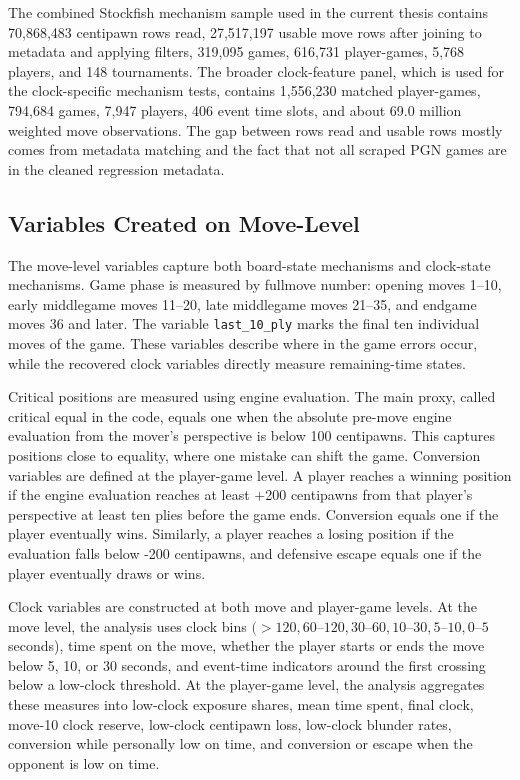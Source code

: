 The combined Stockfish mechanism sample used in the current thesis contains 70,868,483 centipawn rows read, 27,517,197 usable move rows after joining to metadata and applying filters, 319,095 games, 616,731 player-games, 5,768 players, and 148 tournaments. The broader clock-feature panel, which is used for the clock-specific mechanism tests, contains 1,556,230 matched player-games, 794,684 games, 7,947 players, 406 event time slots, and about 69.0 million weighted move observations. The gap between rows read and usable rows mostly comes from metadata matching and the fact that not all scraped PGN games are in the cleaned regression metadata.

\subsection{Variables Created on Move-Level}

The move-level variables capture both board-state mechanisms and clock-state mechanisms. Game phase is measured by fullmove number: opening moves 1--10, early middlegame moves 11--20, late middlegame moves 21--35, and endgame moves 36 and later. The variable \texttt{last\_10\_ply} marks the final ten individual moves of the game. These variables describe where in the game errors occur, while the recovered clock variables directly measure remaining-time states.

Critical positions are measured using engine evaluation. The main proxy, called critical equal in the code, equals one when the absolute pre-move engine evaluation from the mover's perspective is below 100 centipawns. This captures positions close to equality, where one mistake can shift the game. Conversion variables are defined at the player-game level. A player reaches a winning position if the engine evaluation reaches at least +200 centipawns from that player's perspective at least ten plies before the game ends. Conversion equals one if the player eventually wins. Similarly, a player reaches a losing position if the evaluation falls below -200 centipawns, and defensive escape equals one if the player eventually draws or wins.

Clock variables are constructed at both move and player-game levels. At the move level, the analysis uses clock bins \((>120, 60\text{--}120, 30\text{--}60, 10\text{--}30, 5\text{--}10, 0\text{--}5\) seconds), time spent on the move, whether the player starts or ends the move below 5, 10, or 30 seconds, and event-time indicators around the first crossing below a low-clock threshold. At the player-game level, the analysis aggregates these measures into low-clock exposure shares, mean time spent, final clock, move-10 clock reserve, low-clock centipawn loss, low-clock blunder rates, conversion while personally low on time, and conversion or escape when the opponent is low on time.

